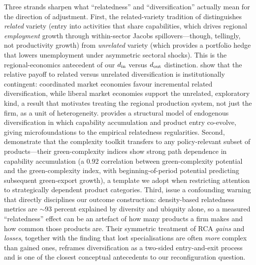 Three strands sharpen what ``relatedness'' and ``diversification'' actually mean for
the direction of adjustment. First, the related-variety tradition of
\citet{frenken2007} distinguishes \emph{related} variety (entry into activities that
share capabilities, which drives regional \emph{employment} growth through
within-sector Jacobs spillovers---though, tellingly, not productivity growth) from
\emph{unrelated} variety (which provides a portfolio hedge that lowers unemployment
under asymmetric sectoral shocks). This is the regional-economics antecedent of our
$d_{\rm in}$ versus $d_{\rm out}$ distinction. \citet{boschma2015} show that the relative payoff to
related versus unrelated diversification is institutionally contingent: coordinated
market economies favour incremental related diversification, while liberal market
economies support the unrelated, exploratory kind, a result that motivates treating
the regional production system, not just the firm, as a unit of heterogeneity.
\citet{freire2019} provides a structural model of endogenous diversification in which
capability accumulation and product entry co-evolve, giving microfoundations to the
empirical relatedness regularities. Second, \citet{mealy2022} demonstrate that the
complexity toolkit transfers to any policy-relevant subset of products---their
green-complexity indices show strong path dependence in capability accumulation
(a $0.92$ correlation between green-complexity potential and the green-complexity
index, with beginning-of-period potential predicting subsequent green-export
growth), a template we adopt when restricting attention to strategically dependent
product categories. Third, \citet{nomaler2023} issue a confounding warning that
directly disciplines our outcome construction: density-based relatedness metrics are
$\sim$93 percent explained by diversity and ubiquity alone, so a measured ``relatedness''
effect can be an artefact of how many products a firm makes and how common those
products are. Their symmetric treatment of RCA \emph{gains} and \emph{losses}, together with
the finding that lost specialisations are often \emph{more} complex than gained
ones, reframes diversification as a two-sided entry-and-exit process and is one of the
closest conceptual antecedents to our reconfiguration question.

